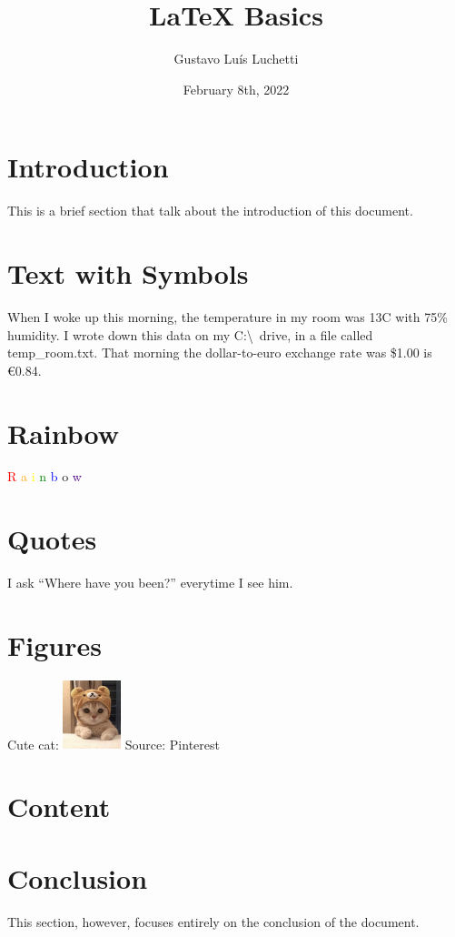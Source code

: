 \documentclass[a4paper]{article}
\title{LaTeX Basics}
\author{Gustavo Luís Luchetti}
\date{February 8th, 2022}
\begin{document}
\maketitle
\tableofcontents
\newpage

\section{Introduction}
This is a brief section that talk about the introduction of this document.
\section{Text with Symbols}
When I woke up this morning, the temperature in my room was 13\textdegree C with 75\% humidity. I wrote down this data on my C:\textbackslash\ drive, in a file called temp\_room.txt. That morning the dollar-to-euro exchange rate was \$1.00 is €0.84.
\section{Rainbow}
{\huge \textcolor{red}{R}%
\textcolor{orange}{a}%
\textcolor{yellow}{i}%
\textcolor{green}{n}%
\textcolor{blue}{b}%
\textcolor{dark-blue}{o}%
\textcolor{indigo}{w}}
\section{Quotes}
I ask ``Where have you been?'' everytime I see him.
\section{Figures}
Cute cat:
\includegraphics[height=2cm]{cute_cat.jpg}
Source: Pinterest
\section{Content}
\lipsum[1-8]
\section{Conclusion}
This section, however, focuses entirely on the conclusion of the document.
\end{document}
